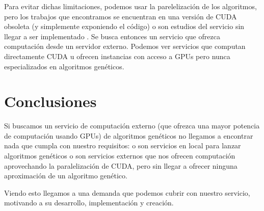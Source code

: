 Para evitar dichas limitaciones, podemos usar la parelelización de los algoritmos, pero los trabajos que encontramos se encuentran en una versión de CUDA obsoleta \cite{paralelizacioncuda} (y simplemente exponiendo el código) o son estudios del servicio sin llegar a ser implementado \cite{optimizacionparalelizacioncuda}. Se busca entonces un servicio que ofrezca computación desde un servidor externo. Podemos ver servicios que computan directamente CUDA \cite{rcuda} u ofrecen instancias con acceso a GPUs \cite{amazoncuda}  pero nunca especializados en algoritmos genéticos.


\bigskip
\section{Conclusiones}
\bigskip

Si buscamos un servicio de computación externo (que ofrezca una mayor potencia de computación usando GPUs) de algoritmos genéticos no llegamos a encontrar nada que cumpla con nuestro requisitos: o son servicios en local para lanzar algoritmos genéticos o son servicios externos que nos ofrecen computación aprovechando la paralelización de CUDA, pero sin llegar a ofrecer ninguna aproximación de un algoritmo genético.

Viendo esto llegamos a una demanda que podemos cubrir con nuestro servicio, motivando a su desarrollo, implementación y creación.







